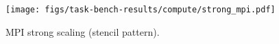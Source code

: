\begin{figure}[t]
\centering
\texttt{[image: figs/task-bench-results/compute/strong\_mpi.pdf]}
\caption{MPI strong scaling (stencil pattern).\label{fig:strong-scaling-mpi}}
\end{figure}

